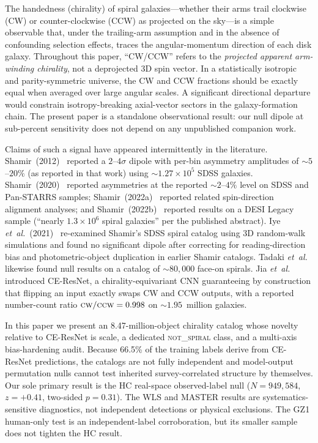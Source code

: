 \documentclass[aps,prd,twocolumn,superscriptaddress,preprintnumbers,nofootinbib,longbibliography,floatfix]{revtex4-2}
\newcommand{\CW}{\textsc{cw}}
\newcommand{\CCW}{\textsc{ccw}}
\newcommand{\NS}{\textsc{not\_spiral}}
\newcommand{\sigmaunit}{\sigma}
\begin{document}
The handedness (chirality) of spiral galaxies---whether their arms trail clockwise (CW) or counter-clockwise (CCW) as projected on the sky---is a simple observable that, under the trailing-arm assumption and in the absence of confounding selection effects, traces the angular-momentum direction of each disk galaxy. Throughout this paper, ``CW/CCW'' refers to the \emph{projected apparent arm-winding chirality}, not a deprojected 3D spin vector. In a statistically isotropic and parity-symmetric universe, the CW and CCW fractions should be exactly equal when averaged over large angular scales. A significant directional departure would constrain isotropy-breaking axial-vector sectors in the galaxy-formation chain. The present paper is a standalone observational result: our null dipole at sub-percent sensitivity does not depend on any unpublished companion work.

Claims of such a signal have appeared intermittently in the literature. Shamir~(2012)~\cite{Shamir:2012} reported a $2\text{--}4\sigmaunit$ dipole with per-bin asymmetry amplitudes of $\sim\!5$--$20\%$ (as reported in that work) using $\sim\!1.27\!\times\!10^{5}$ SDSS galaxies. Shamir~(2020)~\cite{Shamir:2020} reported asymmetries at the reported $\sim\!2$--$4\%$ level on SDSS and Pan-STARRS samples; Shamir~(2022a)~\cite{Shamir:2022} reported related spin-direction alignment analyses; and Shamir~(2022b)~\cite{Shamir:2022DESI} reported results on a DESI Legacy sample (``nearly $1.3\!\times\!10^{6}$ spiral galaxies'' per the published abstract). Iye \textit{et~al.}~(2021)~\cite{Iye:2021} re-examined Shamir's SDSS spiral catalog using 3D random-walk simulations and found no significant dipole after correcting for reading-direction bias and photometric-object duplication in earlier Shamir catalogs. Tadaki \textit{et~al.}~\cite{Tadaki:2020} likewise found null results on a catalog of $\sim\!80{,}000$ face-on spirals. Jia \textit{et~al.}~\cite{Jia:2023} introduced CE-ResNet, a chirality-equivariant CNN guaranteeing by construction that flipping an input exactly swaps CW and CCW outputs, with a reported number-count ratio $\CW/\CCW = 0.998$ on $\sim\!1.95$~million galaxies.

In this paper we present an 8.47-million-object chirality catalog whose novelty relative to CE-ResNet is scale, a dedicated \NS{} class, and a multi-axis bias-hardening audit. Because 66.5\% of the training labels derive from CE-ResNet predictions, the catalogs are not fully independent and model-output permutation nulls cannot test inherited survey-correlated structure by themselves. Our sole primary result is the HC real-space observed-label null ($N=949{,}584$, $z=+0.41$, two-sided $p=0.31$). The WLS and MASTER results are systematics-sensitive diagnostics, not independent detections or physical exclusions. The GZ1 human-only test is an independent-label corroboration, but its smaller sample does not tighten the HC result.
\end{document}
